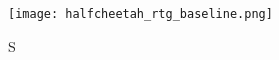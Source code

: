 \documentclass[a4paper]{article}
\begin{document}
\begin{figure}[H]
\centering
\texttt{[image: halfcheetah\_rtg\_baseline.png]}
\caption{S}
\end{figure}





\end{document}
